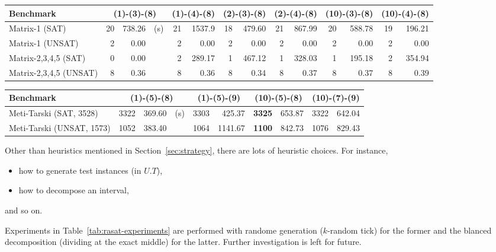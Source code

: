 \begin{table*}[t]
\begin{tabular}{ | l | r | r  r | r | r  | r | r | r | r | r | r |r | r |}
\hline
    \multicolumn{1}{|l|}{Benchmark} & 
    \multicolumn{3}{c|}{(1)-(3)-(8)} & \multicolumn{2}{c|}{(1)-(4)-(8)} & 
    \multicolumn{2}{c|}{(2)-(3)-(8)} & \multicolumn{2}{c|}{(2)-(4)-(8)} & 
    \multicolumn{2}{c|}{(10)-(3)-(8)} & \multicolumn{2}{c|}{(10)-(4)-(8)} \\
\hline
 Matrix-1 (SAT) & 20 & 738.26 & (s) & 21 & 1537.9 & 18 & 479.60 & 21 & 867.99 & 20 & 588.78 & 19 & 196.21 
\\
\hline
 Matrix-1 (UNSAT) & 2 & 0.00 && 2 & 0.00 & 2 & 0.00 & 2 & 0.00 & 2 & 0.00 & 2 & 0.00 
\\
\hline
 Matrix-2,3,4,5 (SAT) & 0 & 0.00 && 2 & 289.17 & 1 & 467.12 & 1 & 328.03 & 1 & 195.18 & 2 & 354.94 
\\
\hline
 Matrix-2,3,4,5 (UNSAT) & 8 & 0.36 && 8 & 0.36 & 8 & 0.34 & 8 & 0.37 & 8 & 0.37 & 8 & 0.39 
\\
\hline
\end{tabular}

\bigskip

\begin{tabular}{ | l | r | r  r | r  | r | r | r | r | r |}
\hline
    \multicolumn{1}{|l|}{Benchmark} & 
    \multicolumn{3}{c|}{(1)-(5)-(8)} & \multicolumn{2}{c|}{(1)-(5)-(9)} & 
    \multicolumn{2}{c|}{(10)-(5)-(8)} & \multicolumn{2}{c|}{(10)-(7)-(9)} \\
\hline
    Meti-Tarski (SAT, 3528) & 3322 & 369.60 & (s) & 3303 & 425.37 & {\bf 3325} & 653.87 & 3322 & 642.04 
\\
\hline
    Meti-Tarski (UNSAT, 1573) & 1052 & 383.40 && 1064 & 1141.67 & {\bf 1100} & 842.73 & 1076 & 829.43 
\\
\hline
\end{tabular}

\medskip
\caption{Combnations of {\bf raSAT} strategies on NRA/Zankl,Meti-Tarski benchmark} 
\label{tab:rasat-experiments}
\end{table*}

Other than heuristics mentioned in Section~\ref{sec:strategy}, 
there are lots of heuristic choices. 
For instance, 
\begin{itemize}
\item how to generate test instances (in $U.T$), 
\item how to decompose an interval, 
\end{itemize} 
and so on. 

Experiments in Table~\ref{tab:rasat-experiments} are performed 
with randome generation ($k$-random tick) for the former and the blanced decomposition 
(dividing at the exact middle) for the latter. 
Further investigation is left for future. 


